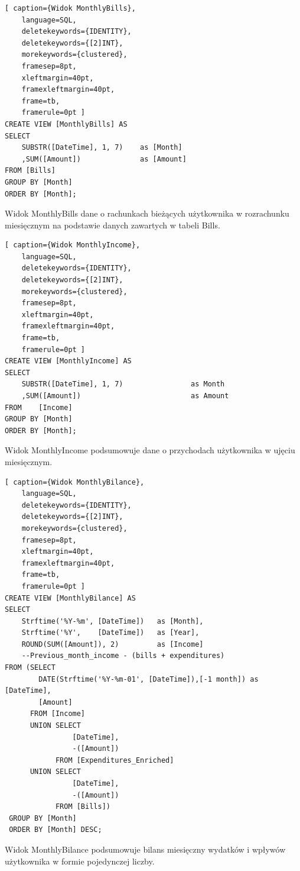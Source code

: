 \documentclass[a4paper,10pt, twoside]{report}
\begin{document}
\begin{minipage}{\textwidth}
\begin{lstlisting}[ caption={Widok MonthlyBills},
    language=SQL,
    deletekeywords={IDENTITY},
    deletekeywords={[2]INT},
    morekeywords={clustered},
    framesep=8pt,
    xleftmargin=40pt,
    framexleftmargin=40pt,
    frame=tb,
    framerule=0pt ]
CREATE VIEW [MonthlyBills] AS
SELECT 
    SUBSTR([DateTime], 1, 7)    as [Month]
    ,SUM([Amount])              as [Amount]
FROM [Bills]
GROUP BY [Month]
ORDER BY [Month];
\end{lstlisting}
{Widok MonthlyBills dane o rachunkach bieżących użytkownika w rozrachunku 
miesięcznym na podstawie danych zawartych w tabeli Bills.}
\end{minipage}

\begin{minipage}{\textwidth}
\begin{lstlisting}[ caption={Widok MonthlyIncome},
    language=SQL,
    deletekeywords={IDENTITY},
    deletekeywords={[2]INT},
    morekeywords={clustered},
    framesep=8pt,
    xleftmargin=40pt,
    framexleftmargin=40pt,
    frame=tb,
    framerule=0pt ]
CREATE VIEW [MonthlyIncome] AS
SELECT
	SUBSTR([DateTime], 1, 7)				as Month
	,SUM([Amount])							as Amount
FROM 	[Income]
GROUP BY [Month]
ORDER BY [Month];
\end{lstlisting}
{Widok MonthlyIncome podsumowuje dane o przychodach użytkownika w ujęciu 
miesięcznym.}
\end{minipage}

\begin{minipage}{\textwidth}
\begin{lstlisting}[ caption={Widok MonthlyBilance},
    language=SQL,
    deletekeywords={IDENTITY},
    deletekeywords={[2]INT},
    morekeywords={clustered},
    framesep=8pt,
    xleftmargin=40pt,
    framexleftmargin=40pt,
    frame=tb,
    framerule=0pt ]
CREATE VIEW [MonthlyBilance] AS 
SELECT 
    Strftime('%Y-%m', [DateTime])   as [Month],
    Strftime('%Y',    [DateTime])   as [Year],
    ROUND(SUM([Amount]), 2)         as [Income]
    --Previous_month_income - (bills + expenditures)
FROM (SELECT 
        DATE(Strftime('%Y-%m-01', [DateTime]),[-1 month]) as [DateTime],
        [Amount]  
      FROM [Income]
      UNION SELECT
                [DateTime], 
                -([Amount]) 
            FROM [Expenditures_Enriched]
      UNION SELECT
                [DateTime],
                -([Amount])
            FROM [Bills])
 GROUP BY [Month]
 ORDER BY [Month] DESC;
\end{lstlisting}
{Widok MonthlyBilance podsumowuje bilans miesięczny wydatków i wpływów 
użytkownika w formie pojedynczej liczby.}
\end{minipage}
\end{document}
